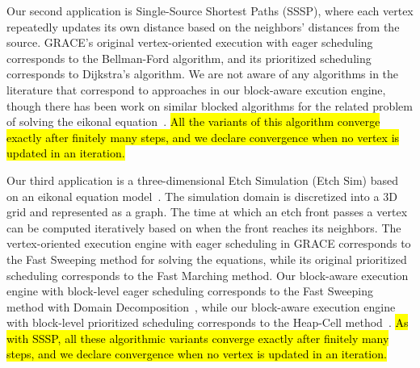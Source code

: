 Our second application is Single-Source Shortest Paths (SSSP), where
each vertex repeatedly updates its own distance based on the
neighbors' distances from the source.  GRACE's original
vertex-oriented execution with eager scheduling corresponds to the
Bellman-Ford algorithm, and its prioritized scheduling corresponds to
Dijkstra's algorithm.  We are not aware of any algorithms in the
literature that correspond to %
approaches in our block-aware
excution engine, though there has been work on similar blocked
algorithms for the related problem of solving the 
eikonal equation~\cite{Chacon12:TwoScale}.
%
\hl{%
All the variants of this algorithm converge exactly after finitely
many steps, and we declare convergence when no vertex is updated in an
iteration.}


Our third application is a three-dimensional Etch Simulation (Etch
Sim)
based on an eikonal equation model~\cite{Sethian99:Methods}. 
The simulation domain is
discretized into a 3D grid and represented as a graph.
%
%
The time at which an etch front passes a vertex can be computed
iteratively based on when the front reaches its neighbors.
%
%
The vertex-oriented execution engine with eager scheduling in GRACE
corresponds to the Fast Sweeping method for solving the equations,
while its original prioritized scheduling corresponds to the Fast
Marching method. Our block-aware execution engine with block-level
eager scheduling corresponds to the Fast Sweeping method with Domain
Decomposition~\cite{SmithBG96:DomianDecomp}, while our block-aware
execution engine with block-level prioritized scheduling corresponds
to the Heap-Cell method~\cite{Chacon12:TwoScale}.
%
\hl{%
As with SSSP, all these algorithmic variants converge exactly after
finitely many steps, and we declare convergence when no vertex is
updated in an iteration.}

